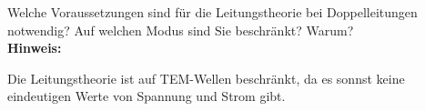 \begin{question}[section=5,subsection=53,name={Leitungstheorie},difficulty=9,type=mdl,mode=exm,tags={}]
	Welche Voraussetzungen sind für die Leitungstheorie bei Doppelleitungen notwendig? Auf welchen Modus sind Sie beschränkt? Warum?
	\\ \textbf{Hinweis:}\\
	
\end{question}
\begin{solution}
	Die Leitungstheorie ist auf TEM-Wellen beschränkt, da es sonnst keine eindeutigen Werte von Spannung und Strom gibt.
\end{solution}